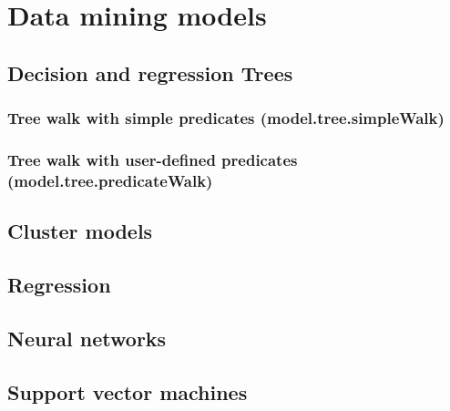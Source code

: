 \documentclass{article}
\theoremstyle{definition}
\begin{document}
\pagebreak

\section{Data mining models}

\subsection{Decision and regression Trees}

\subsubsection{Tree walk with simple predicates (model.tree.simpleWalk)}

\subsubsection{Tree walk with user-defined predicates (model.tree.predicateWalk)}

\subsection{Cluster models}

\subsection{Regression}

\subsection{Neural networks}

\subsection{Support vector machines}
\end{document}
